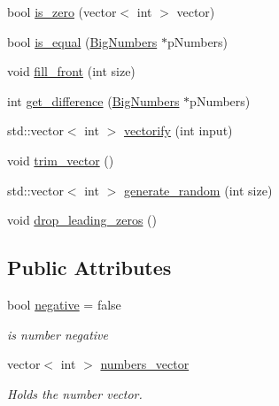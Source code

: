 \begin{DoxyCompactItemize}
\item 
bool \mbox{\hyperlink{classBigNumbers_aadaa69c23de5d36bc361e9c5fcab0ce7}{is\+\_\+zero}} (vector$<$ int $>$ vector)
\item 
bool \mbox{\hyperlink{classBigNumbers_ad5638daadb14c31d3c262a5b963e015f}{is\+\_\+equal}} (\mbox{\hyperlink{classBigNumbers}{Big\+Numbers}} $\ast$p\+Numbers)
\item 
void \mbox{\hyperlink{classBigNumbers_a01e273aec9f5996878710e9bf1ba4273}{fill\+\_\+front}} (int size)
\item 
int \mbox{\hyperlink{classBigNumbers_a019f694d325d65cee5c3a0937b428c9e}{get\+\_\+difference}} (\mbox{\hyperlink{classBigNumbers}{Big\+Numbers}} $\ast$p\+Numbers)
\item 
std\+::vector$<$ int $>$ \mbox{\hyperlink{classBigNumbers_a8ad0e43ccbd70975c217fa96e26d50a3}{vectorify}} (int input)
\item 
void \mbox{\hyperlink{classBigNumbers_a99e5cc37000c1192d718bad688805919}{trim\+\_\+vector}} ()
\item 
std\+::vector$<$ int $>$ \mbox{\hyperlink{classBigNumbers_a98c90a5e552783479d6b42a7a55e3f84}{generate\+\_\+random}} (int size)
\item 
void \mbox{\hyperlink{classBigNumbers_ac335a2d818b21193d9dc6616d12cd87d}{drop\+\_\+leading\+\_\+zeros}} ()
\end{DoxyCompactItemize}
\subsection*{Public Attributes}
\begin{DoxyCompactItemize}
\item 
\mbox{\label{classBigNumbers_afbdf195b03dfad2a7d9f4938de3c1d3f}} 
bool \mbox{\hyperlink{classBigNumbers_afbdf195b03dfad2a7d9f4938de3c1d3f}{negative}} = false
\begin{DoxyCompactList}\small\item\em is number negative \end{DoxyCompactList}\item 
\mbox{\label{classBigNumbers_a1c465fdef8f730ee1092e17bc8b79db7}} 
vector$<$ int $>$ \mbox{\hyperlink{classBigNumbers_a1c465fdef8f730ee1092e17bc8b79db7}{numbers\+\_\+vector}}
\begin{DoxyCompactList}\small\item\em Holds the number vector. \end{DoxyCompactList}\end{DoxyCompactItemize}


